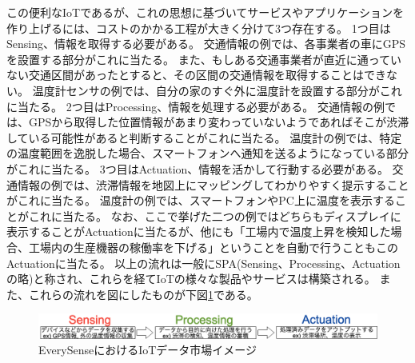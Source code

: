この便利なIoTであるが、これの思想に基づいてサービスやアプリケーションを作り上げるには、コストのかかる工程が大きく分けて3つ存在する。
1つ目はSensing、情報を取得する必要がある。
交通情報の例では、各事業者の車にGPSを設置する部分がこれに当たる。
また、もしある交通事業者が直近に通っていない交通区間があったとすると、その区間の交通情報を取得することはできない。
温度計センサの例では、自分の家のすぐ外に温度計を設置する部分がこれに当たる。
2つ目はProcessing、情報を処理する必要がある。
交通情報の例では、GPSから取得した位置情報があまり変わっていないようであればそこが渋滞している可能性があると判断することがこれに当たる。
温度計の例では、特定の温度範囲を逸脱した場合、スマートフォンへ通知を送るようになっている部分がこれに当たる。
3つ目はActuation、情報を活かして行動する必要がある。
交通情報の例では、渋滞情報を地図上にマッピングしてわかりやすく提示することがこれに当たる。
温度計の例では、スマートフォンやPC上に温度を表示することがこれに当たる。
なお、ここで挙げた二つの例ではどちらもディスプレイに表示することがActuationに当たるが、他にも「工場内で温度上昇を検知した場合、工場内の生産機器の稼働率を下げる」ということを自動で行うこともこのActuationに当たる。
以上の流れは一般にSPA(Sensing、Processing、Actuationの略)と称され、これらを経てIoTの様々な製品やサービスは構築される。
また、これらの流れを図にしたものが下図\ref{SPA}である。
\begin{figure}[htbp]
 \centering
  \includegraphics[width=140mm]{image/SPA.png}
 \caption{EverySenseにおけるIoTデータ市場イメージ}
 \label{SPA}
\end{figure}

